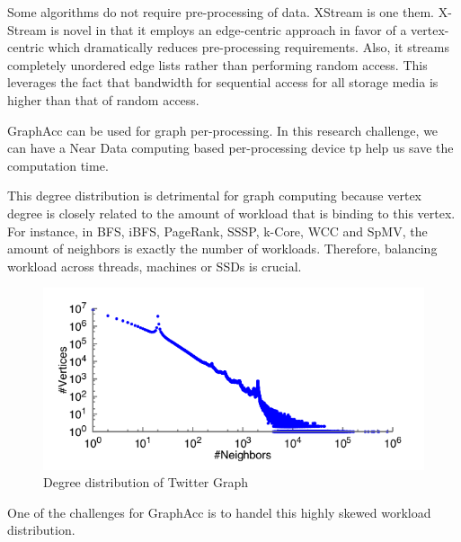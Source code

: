 Some algorithms do not require pre-processing of data.  XStream \cite{roy2013x} is one them.  X-Stream is novel in that it employs an edge-centric approach in favor of a vertex-centric which dramatically reduces pre-processing requirements.   Also, it streams completely unordered edge lists rather than performing random access.  This leverages the fact that bandwidth for sequential access for all storage media is higher than that of random access.

GraphAcc can be used for graph per-processing. In this research challenge, we can have a Near Data computing based per-processing device tp help us save the computation time. 


This degree distribution is detrimental for graph computing because vertex degree is closely related to the amount of workload that is binding to this vertex. For instance, in BFS, iBFS, PageRank, SSSP, k-Core, WCC and SpMV, the amount of neighbors is exactly the number of workloads. Therefore, balancing workload across threads, machines or SSDs is crucial.

\begin{figure}[h]
  \includegraphics[scale = 0.3]{pic/powerdistribution.png}
  \caption{Degree distribution of Twitter Graph}
  \label{fig:power}
\end{figure}

One of the challenges for GraphAcc is to handel this highly skewed workload distribution.  

